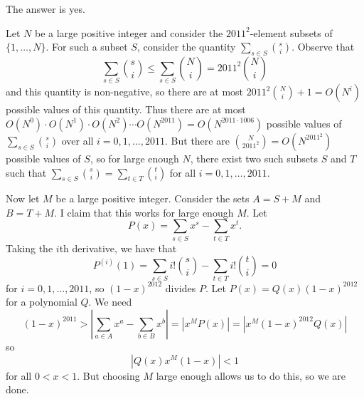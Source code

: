 The answer is yes.

Let $N$ be a large positive integer and consider the $2011^2$-element subsets of $\{1,\ldots,N\}$. For such a subset $S$, consider the quantity $\displaystyle\sum_{s\in S}\binom{s}{i}$. Observe that \[\sum_{s\in S}\binom{s}{i}\leq\sum_{s\in S}\binom{N}{i}=2011^2\binom{N}{i}\] and this quantity is non-negative, so there are at most $2011^2\binom{N}{i}+1=O(N^i)$ possible values of this quantity. Thus there are at most $O(N^0)\cdot O(N^1)\cdot O(N^2)\cdots O(N^{2011})=O(N^{2011\cdot1006})$ possible values of $\displaystyle\sum_{s\in S}\binom{s}{i}$ over all $i=0,1,\ldots,2011$. But there are $\binom{N}{2011^2}=O(N^{2011^2})$ possible values of $S$, so for large enough $N$, there exist two such subsets $S$ and $T$ such that $\displaystyle\sum_{s\in S}\binom{s}{i}=\displaystyle\sum_{t\in T}\binom{t}{i}$ for all $i=0,1,\ldots,2011$.

Now let $M$ be a large positive integer. Consider the sets $A=S+M$ and $B=T+M$. I claim that this works for large enough $M$. Let \[P(x)=\sum_{s\in S}x^s-\sum_{t\in T}x^t.\] Taking the $i$th derivative, we have that \[P^{(i)}(1)=\sum_{s\in S}i!\binom{s}{i}-\sum_{t\in T}i!\binom{t}{i}=0\] for $i=0,1,\ldots,2011$, so $(1-x)^{2012}$ divides $P$. Let $P(x)=Q(x)(1-x)^{2012}$ for a polynomial $Q$. We need \[(1-x)^{2011}>\left|\sum_{a\in A}x^a-\sum_{b\in B}x^b\right|=\left|x^MP(x)\right|=\left|x^M(1-x)^{2012}Q(x)\right|\] so \[\left|Q(x)x^M(1-x)\right|<1\] for all $0<x<1$. But choosing $M$ large enough allows us to do this, so we are done.